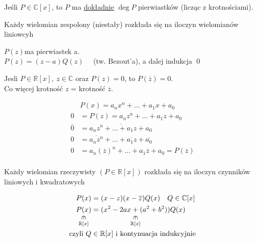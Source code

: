 \begin{wn} 
    Jeśli $P \in \mathbb{C}[x]$, to $P$ ma \underline{dokładnie} $\operatorname{deg} P$ pierwiastków 
    (licząc z krotnościami).
\end{wn}
\begin{wn} 
    Każdy wielomian zespolony (niestały) rozkłada się na iloczyn wielomianów liniowcyh \end{wn} 
\begin{dd} 
    $P(z) $ma pierwiastek a.\\ 
    $P(z) = (z-a)Q(z) \quad$ (tw. Bezout'a), a dalej indukcja \hfill \qed
\end{dd} 
\begin{ft} 
    Jesli $P \in \mathbb{R}[x], \ z \in \mathbb{C} $ oraz $P(z) = 0$, to $P(\overline{z}) = 0$. \\ 
    Co więcej krotność $z$ = krotność $\overline{z}$.
\end{ft}
\begin{dd} 
    \begin{align*} 
        &P(x) = a_nx^n + \ldots + a_1x + a_0 \\ 
        0 &= P(z) = a_nz^n + \ldots + a_1z + a_0 \\ 
        \overline{0} &= \overline{a_nz^n + \ldots + a_1z+a_0}\\ 
        0 &= \overline{a_nz^n} + \ldots + \overline{a_1z} + \overline{a_0} \\ 
        0 &= a_n(\overline{z})^n + \ldots + a_1\overline{z} + a_0 = P(\overline{z}) \\
    \end{align*} 
\end{dd} 
\begin{wn} 
    Każdy wielomian rzeczywisty $(P \in \mathbb{R}[x])$ rozkłada się na iloczyn czynników liniowych i kwadratowych
\end{wn}
\begin{dd} 
    \begin{align*} 
        P(x) & = (x-z)(x-\overline{z})Q(x) \quad Q \in \mathbb{C}[x] \\  
        \underscript{P(x)}{\vertin}{\mathbb{R}[x]} & = \underscript{(x^2 - 2ax + (a^2 + b^2))}{\vertin}{\mathbb{R}[x]}Q(x) \\ 
        \text{czyli } Q &\in \mathbb{R}[x] \text{ i kontynuacja indukcyjnie}
    \end{align*}
\end{dd} 
